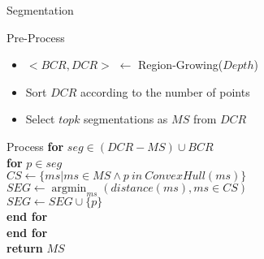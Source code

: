 \documentclass[xcolor=table,compress,blue]{beamer}
\begin{document}
\begin{frame}{Segmentation}
	\begin{exampleblock}{Pre-Process}
		\begin{itemize}
			\item $<BCR, DCR>$ $\leftarrow$ Region-Growing($Depth$)
			\item Sort $DCR$ according to the number of points
			\item Select $topk$ segmentations as $MS$ from $DCR$
		\end{itemize}
	\end{exampleblock}
	\begin{exampleblock}{Process}
		\textbf{for} {$seg \in  (DCR - MS) \cup BCR$}
		\\ \quad \textbf{for} {$p \in seg$}
		\\ \quad \quad $CS \leftarrow \{ms|ms \in MS \wedge p\ in\ ConvexHull(ms)\}$
		\\ \quad \quad $SEG \leftarrow \mathop{\arg\min}_{ms}(distance(ms), ms\in CS)$	
		\\ \quad \quad $SEG \leftarrow SEG \cup \{p\}$
	    \\ \quad \textbf{end for}
		\\ \textbf{end for} 
		\\ \textbf{return} $MS$
	\end{exampleblock}
\end{frame}
\end{document}

